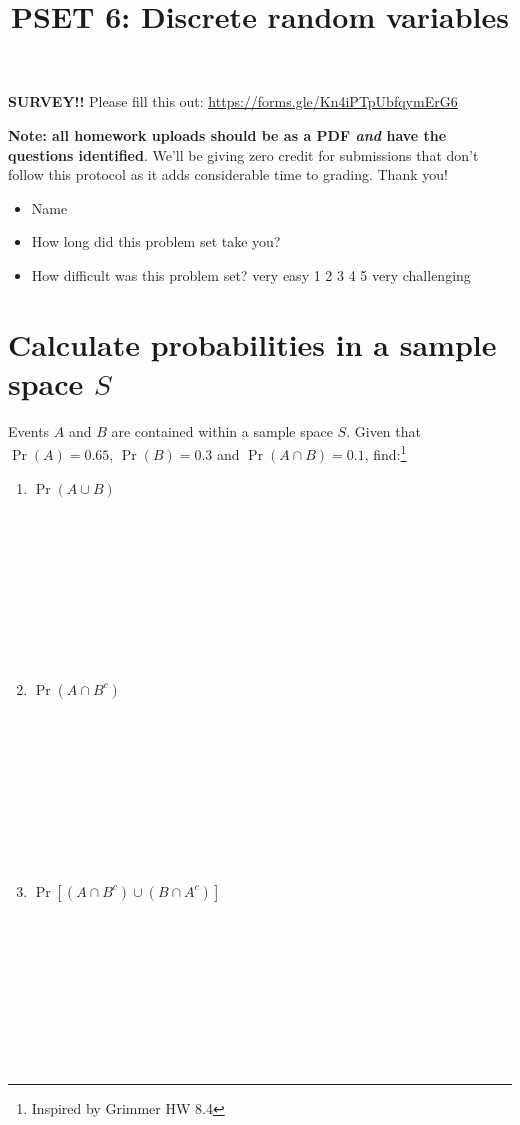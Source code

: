 \documentclass[
]{article}
\title{PSET 6: Discrete random variables}
\author{}
\date{\vspace{-2.5em}}
\begin{document}
\maketitle

\textbf{SURVEY!!} Please fill this out:
\url{https://forms.gle/Kn4iPTpUbfqymErG6}

\textbf{Note: all homework uploads should be as a PDF \emph{and} have
the questions identified}. We'll be giving zero credit for submissions
that don't follow this protocol as it adds considerable time to grading.
Thank you!

\begin{itemize}
\item
  Name
\item
  How long did this problem set take you?
\item
  How difficult was this problem set? very easy 1 2 3 4 5 very
  challenging
\end{itemize}

\section{\texorpdfstring{Calculate probabilities in a sample space
\(S\)}{Calculate probabilities in a sample space S}}\label{calculate-probabilities-in-a-sample-space-s}

Events \(A\) and \(B\) are contained within a sample space \(S\). Given
that \(\Pr(A)=0.65\), \(\Pr(B)=0.3\) and \(\Pr(A \cap B) = 0.1\),
find:\footnote{Inspired by Grimmer HW 8.4}

\begin{enumerate}
\def\labelenumi{\alph{enumi}.}
\item
  \(\Pr(A \cup B)\)

  \strut \\
  \strut ~\\
  \strut ~\\
  \strut ~\\
  \strut \\
\item
  \(\Pr(A \cap B^c)\)

  \strut \\
  \strut ~\\
  \strut ~\\
  \strut ~\\
  \strut \\
\item
  \(\Pr[(A \cap B^c) \cup (B \cap A^c)]\)

  \strut \\
  \strut ~\\
  \strut ~\\
  \strut ~\\
  \strut \\
\end{enumerate}
\end{document}
